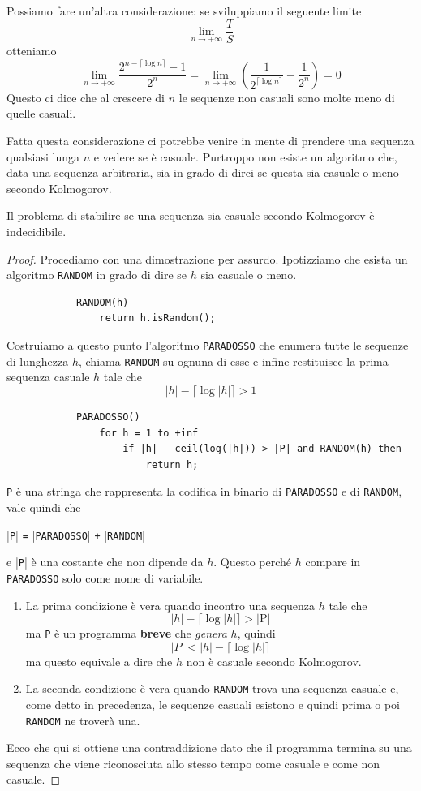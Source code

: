 Possiamo fare un'altra considerazione: se sviluppiamo il seguente limite
\[ \lim_{n \rightarrow +\infty} \frac{T}{S} \]
otteniamo
\[
	\lim_{n \rightarrow +\infty} \frac{2^{n - \lceil \log n \rceil} - 1}{2^n} =
	\lim_{n \rightarrow +\infty} \left( \frac{1}{2^{\lceil \log n \rceil}} - \frac{1}{2^n}\right) = 0
\]
Questo ci dice che al crescere di $n$ le sequenze non casuali sono molte meno di quelle casuali.

Fatta questa considerazione ci potrebbe venire in mente di prendere una sequenza qualsiasi lunga $n$ e vedere se \`e
casuale. Purtroppo non esiste un algoritmo che, data una sequenza arbitraria, sia in grado di dirci se questa sia
casuale o meno secondo Kolmogorov.

\begin{theorem}
	Il problema di stabilire se una sequenza sia casuale secondo Kolmogorov \`e indecidibile.
	\begin{proof}
		Procediamo con una dimostrazione per assurdo. Ipotizziamo che esista un algoritmo \verb|RANDOM| in grado di
		dire se $h$ sia casuale o meno.
		\begin{lstlisting}
			RANDOM(h)
				return h.isRandom();
		\end{lstlisting}
		Costruiamo a questo punto l'algoritmo \verb|PARADOSSO| che enumera tutte le sequenze di lunghezza $h$, chiama
		\verb|RANDOM| su ognuna di esse	e infine restituisce la prima sequenza casuale $h$ tale che
		\[ |h| - \lceil \log |h| \rceil > 1 \]
		\begin{lstlisting}
			PARADOSSO()
				for h = 1 to +inf
					if |h| - ceil(log(|h|)) > |P| and RANDOM(h) then
						return h;
		\end{lstlisting}
		\verb|P| \`e una stringa che rappresenta la codifica in binario di \verb|PARADOSSO| e di \verb|RANDOM|, vale
		quindi che
		\begin{center}
			|\verb|P|| \verb|=| |\verb|PARADOSSO|| \verb|+| |\verb|RANDOM||
		\end{center}
		e |\verb|P|| \`e una costante che non dipende da $h$. Questo perch\'e $h$ compare in \verb|PARADOSSO| solo come
		nome di variabile.

		\begin{enumerate}
			\item La prima condizione \`e vera quando incontro una sequenza $h$ tale che
			      \[ |h| - \lceil \log |h| \rceil > |\text{P}| \]
			      ma \verb|P| \`e un programma \textbf{breve} che \emph{genera} $h$, quindi
			      \[ |P| < |h| - \lceil \log |h| \rceil \]
			      ma questo equivale a dire che $h$ non \`e casuale secondo Kolmogorov.
			\item La seconda condizione \`e vera quando \verb|RANDOM| trova una sequenza casuale e, come detto in
			      precedenza, le sequenze casuali esistono e quindi prima o poi \verb|RANDOM| ne trover\`a una.
		\end{enumerate}
		Ecco che qui si ottiene una contraddizione dato che il programma termina su una sequenza che viene riconosciuta
		allo stesso tempo come casuale e come non casuale.
	\end{proof}
\end{theorem}

